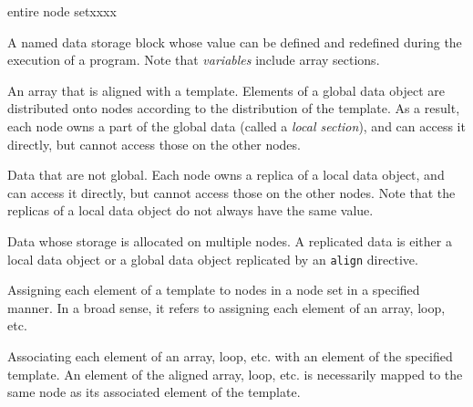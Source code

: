 \begin{namelist}{entire node setxxxx}


 A named data storage block whose value can be defined and redefined
 during the execution of a program. Note that {\it variables} include
 array sections.


 An array that is aligned with a template. Elements of a global data
 object are
 distributed onto nodes according to the distribution of the
 template. As a result, each node owns a part of the global data (called a
 {\it local section}), and can access it directly, but cannot access
 those on the other nodes.



 Data that are not global. Each node owns a replica of a local data object,
 and can access it directly, but cannot access those on the other
 nodes. Note that the replicas of a local data object do not always have the
 same value.



 Data whose storage is allocated on multiple nodes. A replicated data
 is either a local data object or a global data object replicated by an
 {\tt align} directive.


 Assigning each element of a template to nodes in a node set in a
 specified manner. In a broad sense, it refers to assigning each element
 of an array, loop, etc.



 Associating each element of an array, loop, etc. with an element of
 the specified template. An element of the aligned array, loop,
 etc. is necessarily mapped to the same node as its associated element
 of the template.



\end{namelist}

